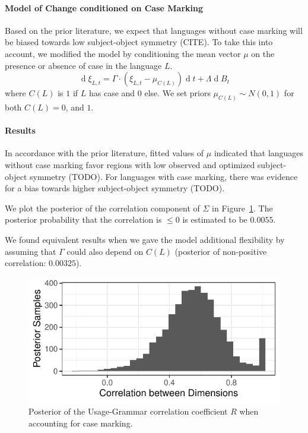 \documentclass[11pt,a4paper]{article}
\begin{document}
\paragraph{Model of Change conditioned on Case Marking}
Based on the prior literature, we expect that languages without case marking will be biased towards low subject-object symmetry (CITE).
To take this into account, we modified the model by conditioning the mean vector $\mu$ on the presence or absence of case in the language $L$.
\begin{equation*}
    \operatorname{d}\xi_{L,t} = \Gamma \cdot (\xi_{L,t}-\mu_{C(L)}) \operatorname{d}t + \Lambda \operatorname{d}B_t
\end{equation*}
where $C(L)$ is $1$ if $L$ has case and $0$ else.
We set priors $\mu_{C(L)} \sim N(0,1)$ for both $C(L) = 0$, and $1$.


\paragraph{Results}
In accordance with the prior literature, fitted values of $\mu$ indicated that languages without case marking favor regions with low observed and optimized subject-object symmetry (TODO).
For languages with case marking, there was evidence for a bias towards higher subject-object symmetry (TODO).

We plot the posterior of the correlation component of $\Sigma$ in Figure~\ref{fig:posterior-case}.
The posterior probability that the correlation is $\leq 0$ is estimated to be $0.0055$.

We found equivalent results when we gave the model additional flexibility by assuming that $\Gamma$ could also depend on $C(L)$ (posterior of non-positive correlation: $0.00325$).

\begin{figure}
    \centering
    \includegraphics{change/figures/corr_ornuhl-binom_42.pdf}
    \caption{Posterior of the Usage-Grammar correlation coefficient $R$ when accounting for case marking.}
    \label{fig:posterior-case}
\end{figure}

\end{document}

